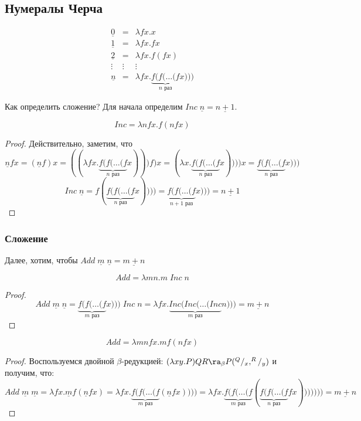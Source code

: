 
\subsection{Нумералы Черча}
\begin{definition}
    
    \[\begin{array}{ccl}
        \underline{0} & = & \lambda fx.x \\
        \underline{1} & = & \lambda fx.fx \\
        \underline{2} & = & \lambda fx.f(fx) \\
        \vdots & \vdots & \vdots\\
        \underline{n} & = & \lambda fx.\underbrace{f(f(\dots(f}_{n\text{ раз}}x)))
    \end{array}\]
\end{definition}

Как определить сложение? Для начала определим \(Inc\; \underline{n} = \underline{n + 1}\). 
\begin{definition}
    \[Inc = \lambda nfx.f(nfx)\]
\end{definition}
\begin{proof}
    Действительно, заметим, что 
    \[\underline{n}fx = (\underline{n}f)x = ((\lambda fx.\underbrace{f(f(\dots(f}_{n\text{ раз}}x)))f)x = (\lambda x.\underbrace{f(f(\dots(f}_{n\text{ раз}}x))))x = \underbrace{f(f(\dots(f}_{n\text{ раз}}x)))\]
    \[Inc\;\underline{n} = f(\underbrace{f(f(\dots(f}_{n\text{ раз}}x)))) = \underbrace{f(f(\dots(f}_{n + 1\text{ раз}}x))) = \underline{n + 1}\]
\end{proof}

\subsubsection{Сложение}
Далее, хотим, чтобы \(Add\;\underline{m}\;\underline{n} = \underline{m + n}\)
\begin{definition}
    \[Add = \lambda mn.m \;Inc\;n\]
\end{definition}
\begin{proof}
    \[Add\;\underline{m}\;\underline{n} = \underbrace{f(f(\dots(f}_{m\text{ раз}}x)))\;Inc\;n = \lambda fx.\underbrace{Inc(Inc(\dots(Inc}_{m\text{ раз}}n))) =  \underline{m + n}\]
\end{proof}

\begin{definition}
    \[Add = \lambda mnfx.mf(nfx)\]
\end{definition}
\begin{proof}
    Воспользуемся двойной \(\beta\)-редукцией: \((\lambda xy.P)QR \ra_\beta P(^Q/_x, ^R/_y)\) и получим, что:
    \[Add\;\underline{m}\;\underline{m} = \lambda fx.\underline{m}f(\underline{n}fx) = \lambda fx.\underbrace{f(f(\dots(f}_{m\text{ раз}}(\underline{n}fx)))) = \lambda fx.\underbrace{f(f(\dots(f}_{m\text{ раз}}(\underbrace{f(f(\dots(f}_{n\text{ раз}}fx))))))) = \underline{m + n}\]
\end{proof}

